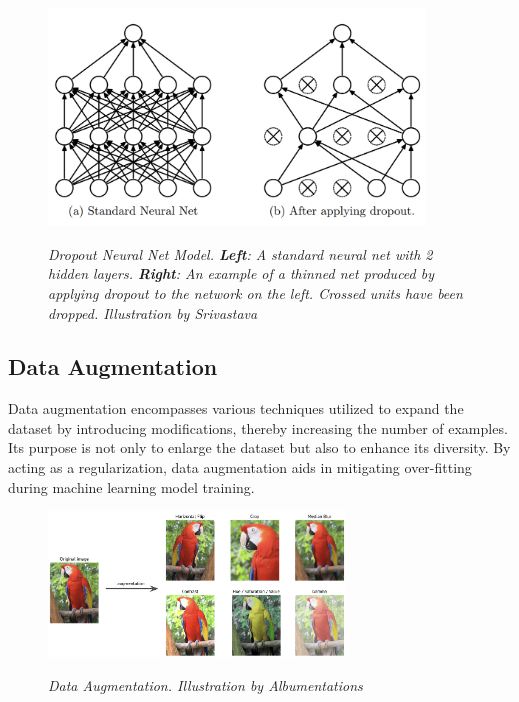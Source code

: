 \begin{figure}[H]
  \centering
  \includegraphics[width=10cm]{imatges/preliminaries/dropout.png}
  \caption[Dropout]{\textit{Dropout Neural Net Model. \textbf{Left}: A standard neural net with 2 hidden layers. \textbf{Right}:
  An example of a thinned net produced by applying dropout to the network on the left.
  Crossed units have been dropped. Illustration by Srivastava}}
  {\label{fig:dropout}}
\end{figure}

\newpage

\subsection{Data Augmentation}

Data augmentation encompasses various techniques utilized to expand the dataset
by introducing modifications, thereby increasing the number of examples. Its
purpose is not only to enlarge the dataset but also to enhance its diversity.
By acting as a regularization, data augmentation aids in mitigating
over-fitting during machine learning model training.

\begin{figure}[H]
  \centering
  \includegraphics[width=0.7\textwidth]{imatges/preliminaries/augmentation.jpg}
  \caption[Data Augmentation]{\textit{Data Augmentation. Illustration by Albumentations}}
  {\label{fig:augmentation}}
\end{figure}


